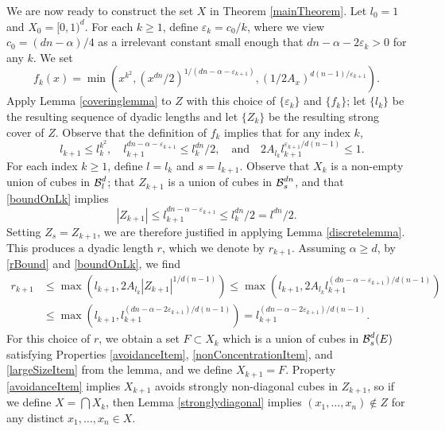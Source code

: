 We are now ready to construct the set $X$ in Theorem \ref{mainTheorem}. Let $l_0 = 1$ and $X_0 = [0,1)^d$. For each $k \geq 1$, define $\varepsilon_k = c_0/k$, where we view $c_0 = (dn - \alpha)/4$ as a irrelevant constant small enough that $dn - \alpha - 2\varepsilon_k > 0$ for any $k$. We set
%
\[	f_k(x) = \min \left( x^{k^2}, (x^{dn}/2)^{1/(dn - \alpha - \varepsilon_{k+1})}, (1/2A_x)^{d(n-1)/\varepsilon_{k+1}} \right). \]
%
Apply Lemma \ref{coveringlemma} to $Z$ with this choice of $\{\varepsilon_k\}$ and $\{ f_k \}$; let $\{ l_k \}$ be the resulting sequence of dyadic lengths and let $\{Z_k\}$ be the resulting strong cover of $Z$. Observe that the definition of $f_k$ implies that for any index $k$,
%
\begin{equation} \label{boundOnLk}
	\quad l_{k+1} \leq l_k^{k^2}, \quad l_{k+1}^{dn - \alpha - \varepsilon_{k+1}} \leq l_k^{dn}/2, \quad \text{and} \quad 2A_{l_k} l_{k+1}^{\varepsilon_{k+1}/d(n-1)} \leq 1.
\end{equation}
%
For each index $k \geq 1$, define $l = l_k$ and $s = l_{k+1}$. Observe that $X_k$ is a non-empty union of cubes in $\operatorname{\mathcal{B}}^d_l$; that $Z_{k+1}$ is a union of cubes in $\operatorname{\mathcal{B}}^{dn}_s$, and that \eqref{boundOnLk} implies
%
\[ |Z_{k+1}| \leq l_{k+1}^{dn - \alpha - \varepsilon_{k+1}} \leq l_k^{dn}/2 = l^{dn}/2. \]
%
Setting $Z_s = Z_{k+1}$, we are therefore justified in applying Lemma \ref{discretelemma}. This produces a dyadic length $r$, which we denote by $r_{k+1}$. Assuming
$\alpha \geq d$, by \eqref{rBound} and \eqref{boundOnLk}, we find
%
\begin{equation} \label{rKBound}
\begin{aligned}
	r_{k+1} &\leq \max \left(l_{k+1}, 2 A_{l_k} |Z_{k+1}|^{1/d(n-1)} \right) \leq \max \left(l_{k+1}, 2 A_{l_k} l_{k+1}^{(dn - \alpha - \varepsilon_{k+1})/d(n-1)} \right)\\
	&\leq \max \left(l_{k+1}, l_{k+1}^{(dn - \alpha - 2\varepsilon_{k+1})/d(n-1)} \right) = l_{k+1}^{(dn - \alpha - 2\varepsilon_{k+1})/d(n-1)}.
\end{aligned}
\end{equation}
%
For this choice of $r$, we obtain a set $F \subset X_k$ which is a union of cubes in $\operatorname{\mathcal{B}}^d_s(E)$ satisfying Properties \ref{avoidanceItem}, \ref{nonConcentrationItem}, and \ref{largeSizeItem} from the lemma, and we define $X_{k+1} = F$. Property \ref{avoidanceItem} implies $X_{k+1}$ avoids strongly non-diagonal cubes in $Z_{k+1}$, so if we define $X = \bigcap X_k$, then Lemma \ref{stronglydiagonal} implies $(x_1, \dots, x_n) \not \in Z$ for any distinct $x_1, \dots, x_n \in X$.

